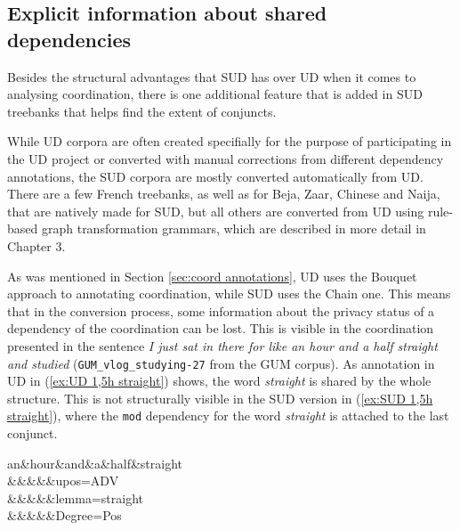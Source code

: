 \subsection{Explicit information about shared dependencies}
Besides the structural advantages that SUD has over UD when it comes to analysing coordination, there is one additional feature that is added in SUD treebanks that helps find the extent of conjuncts. 

While UD corpora are often created specifially for the purpose of participating in the UD project or converted with manual corrections from different dependency annotations, the SUD corpora are mostly converted automatically from UD. There are a few French treebanks, as well as for Beja, Zaar, Chinese and Naija, that are natively made for SUD, but all others are converted from UD using rule-based graph transformation grammars, which are described in more detail in Chapter 3. 

As was mentioned in Section \ref{sec:coord annotations}, UD uses the Bouquet approach to annotating coordination, while SUD uses the Chain one. This means that in the conversion process, some information about the privacy status of a dependency of the coordination can be lost. This is visible in the coordination presented in the sentence \textsl{I just sat in there for like an hour and a half straight and studied} (\texttt{GUM\_vlog\_studying-27} from the GUM corpus). As annotation in UD in (\ref{ex:UD 1,5h straight}) shows, the word \textsl{straight} is shared by the whole structure. This is not structurally visible in the SUD version in (\ref{ex:SUD 1,5h straight}), where the \texttt{mod} dependency for the word \textsl{straight} is attached to the last conjunct. 

\begin{exe}
    \ex
    \label{ex:UD 1,5h straight}
    \begin{dependency}[theme = simple, baseline=-\the\dimexpr\fontdimen22\textfont2\relax]
        \begin{deptext}
            an\&hour\&and\&a\&half\&straight\\
            \&\&\&\&\&\footnotesize\textsf{upos=ADV}\\
            \&\&\&\&\&\footnotesize\textsf{lemma=straight}\\
            \&\&\&\&\&\footnotesize\textsf{Degree=Pos}\\
        \end{deptext}
    \end{dependency}
\end{exe}

